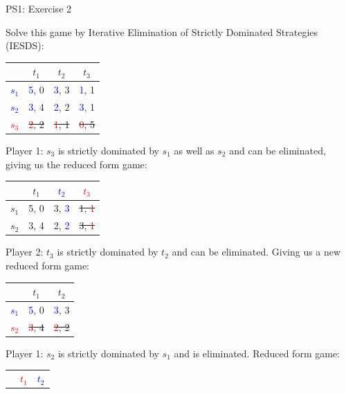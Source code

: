 \begin{frame}{PS1: Exercise 2}
\begin{multicols}{2}
  Solve this game by Iterative Elimination of Strictly Dominated Strategies (IESDS):
  \begin{table}
    \begin{tabular}{c|c|c|c}
            & $t_1$ & $t_2$ & $t_3$ \\
      \midrule
      \textcolor{blue}{$s_1$} & \textcolor{blue}{5}, 0  & \textcolor{blue}{3}, 3  & \textcolor{blue}{1}, 1 \\
      \midrule
      \textcolor{blue}{$s_2$} & \textcolor{blue}{3}, 4  & \textcolor{blue}{2}, 2  & \textcolor{blue}{3}, 1 \\
      \midrule
      \sout{\textcolor{red}{$s_3$}} & \sout{\textcolor{red}{2}, 2}  & \sout{\textcolor{red}{1}, 1}  & \sout{\textcolor{red}{0}, 5}
    \end{tabular}
  \end{table}
  Player 1: $s_3$ is strictly dominated by $s_1$ as well as $s_2$ and can be eliminated, giving us the reduced form game:
  \begin{table}
    \begin{tabular}{c|c|c|c}
            & $t_1$ & \textcolor{blue}{$t_2$} & \sout{\textcolor{red}{$t_3$}} \\
      \midrule
      $s_1$ & 5, 0  & 3, \textcolor{blue}{3}  & \sout{1, \textcolor{red}{1}} \\
      \midrule
      $s_2$ & 3, 4  & 2, \textcolor{blue}{2}  & \sout{3, \textcolor{red}{1}}
    \end{tabular}
  \end{table}
  Player 2: $t_3$ is strictly dominated by $t_2$ and can be eliminated.
\vfill\null
\columnbreak
Giving us a new reduced form game:
\begin{table}
  \begin{tabular}{c|c|c}
          & $t_1$ & $t_2$ \\
    \midrule
    \textcolor{blue}{$s_1$} & \textcolor{blue}{5}, 0  & \textcolor{blue}{3}, 3  \\
    \midrule
    \sout{\textcolor{red}{$s_2$}} & \sout{\textcolor{red}{3}, 4}  & \sout{\textcolor{red}{2}, 2}
  \end{tabular}
\end{table}
Player 1: $s_2$ is strictly dominated by $s_1$ and is eliminated. Reduced form game:
\begin{table}
  \begin{tabular}{c|c|c}
          & \textcolor{red}{$t_1$} & \textcolor{blue}{$t_2$} \\

\end{tabular}
\end{table}
\end{multicols}
\end{frame}
